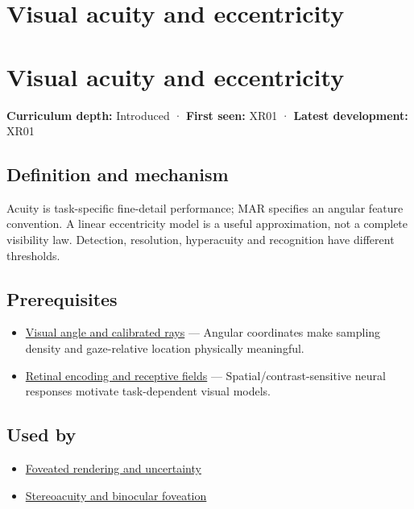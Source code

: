 \hypertarget{appendix-b491fc48c54b}{}
\section*{Visual acuity and eccentricity}
\section{Visual acuity and eccentricity}\label{appendix-b491fc48c54b-visual-acuity-and-eccentricity}

\textbf{Curriculum depth:} Introduced · \textbf{First seen:} XR01 · \textbf{Latest development:} XR01

\subsection{Definition and mechanism}\label{appendix-b491fc48c54b-definition-and-mechanism}

Acuity is task-specific fine-detail performance; MAR specifies an angular feature convention. A linear eccentricity model is a useful approximation, not a complete visibility law. Detection, resolution, hyperacuity and recognition have different thresholds.

\subsection{Prerequisites}\label{appendix-b491fc48c54b-prerequisites}

\begin{itemize}
\tightlist
\item
  \hyperref[appendix-7d356c396d1a]{Visual angle and calibrated rays} --- Angular coordinates make sampling density and gaze-relative location physically meaningful.
\item
  \hyperref[appendix-7281c15ac44a]{Retinal encoding and receptive fields} --- Spatial/contrast-sensitive neural responses motivate task-dependent visual models.
\end{itemize}

\subsection{Used by}\label{appendix-b491fc48c54b-used-by}

\begin{itemize}
\tightlist
\item
  \hyperref[appendix-5878b813b732]{Foveated rendering and uncertainty}
\item
  \hyperref[appendix-8dc848f14052]{Stereoacuity and binocular foveation}
\end{itemize}


